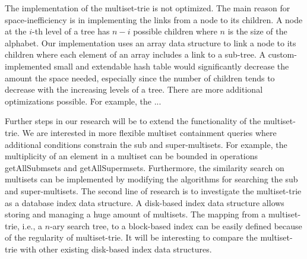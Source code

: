 The implementation of the multiset-trie is not optimized. The main reason for space-inefficiency is in implementing the links from a node to its children. A node at the $i$-th level of a tree has $n-i$ possible children where $n$ is the size of the alphabet. Our implementation uses an array data structure to link a node to its children where each element of an array includes a link to a sub-tree. A custom-implemented small and extendable hash table would significantly decrease the amount the space needed, especially since the number of children tends to decrease with the increasing levels of a tree. There are more additional optimizations possible. For example, the ...

%
Further steps in our research will be to extend the functionality of the multiset-trie. We are interested in more flexible multiset containment queries where additional conditions constrain the sub and super-multisets. For example, the multiplicity of an element in a multiset can be bounded in operations getAllSubmsets and getAllSupermsets. Furthermore, the similarity search on multisets can be implemented by modifying the algorithms for searching the sub and super-multisets. 
%
The second line of research is to investigate the multiset-trie as a database index data structure. A disk-based index data structure allows storing and managing a huge amount of multisets. The mapping from a multiset-trie, i.e., a $n$-ary search tree, to a block-based index can be easily defined because of the regularity of multiset-trie. It will be interesting to compare the multiset-trie with other existing disk-based index data structures.
